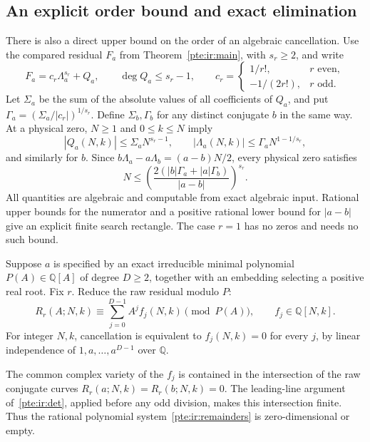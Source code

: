 \documentclass[11pt,a4paper]{article}
\numberwithin{equation}{section}
\theoremstyle{definition}
\theoremstyle{plain}
\begin{document}
\subsection{An explicit order bound and exact elimination}\label{pte:sec:ir-order}
There is also a direct upper bound on the order of an algebraic cancellation. Use the compared residual $F_a$ from Theorem~\ref{pte:ir:main}, with $s_r\ge2$, and write
\[
 F_a=c_r\Lambda_a^{s_r}+Q_a,\qquad \deg Q_a\le s_r-1,
 \qquad
 c_r=\begin{cases}1/r!,&r\text{ even},\\-1/(2r!),&r\text{ odd}.\end{cases}
\]
Let $\Sigma_a$ be the sum of the absolute values of all coefficients of $Q_a$, and put $\Gamma_a=(\Sigma_a/|c_r|)^{1/s_r}$. Define $\Sigma_b,\Gamma_b$ for any distinct conjugate $b$ in the same way. At a physical zero, $N\ge1$ and $0\le k\le N$ imply
\[
 |Q_a(N,k)|\le\Sigma_aN^{s_r-1},\qquad
 |\Lambda_a(N,k)|\le\Gamma_aN^{1-1/s_r},
\]
and similarly for $b$. Since $b\Lambda_a-a\Lambda_b=(a-b)N/2$, every physical zero satisfies
\begin{equation}\label{pte:ir:orderbound}
 \boxed{\displaystyle
 N\le\left(\frac{2(|b|\Gamma_a+|a|\Gamma_b)}{|a-b|}\right)^{s_r}.}
\end{equation}
All quantities are algebraic and computable from exact algebraic input. Rational upper bounds for the numerator and a positive rational lower bound for $|a-b|$ give an explicit finite search rectangle. The case $r=1$ has no zeros and needs no such bound.

Suppose $a$ is specified by an exact irreducible minimal polynomial $P(A)\in\mathbb Q[A]$ of degree $D\ge2$, together with an embedding selecting a positive real root. Fix $r$. Reduce the raw residual modulo $P$:
\begin{equation}\label{pte:ir:remainders}
 R_r(A;N,k)\equiv\sum_{j=0}^{D-1}A^jf_j(N,k)\pmod{P(A)},
 \qquad f_j\in\mathbb Q[N,k].
\end{equation}
For integer $N,k$, cancellation is equivalent to $f_j(N,k)=0$ for every $j$, by linear independence of $1,a,\ldots,a^{D-1}$ over $\mathbb Q$.

The common complex variety of the $f_j$ is contained in the intersection of the raw conjugate curves $R_r(a;N,k)=R_r(b;N,k)=0$. The leading-line argument of~\eqref{pte:ir:det}, applied before any odd division, makes this intersection finite. Thus the rational polynomial system~\eqref{pte:ir:remainders} is zero-dimensional or empty.
\end{document}
